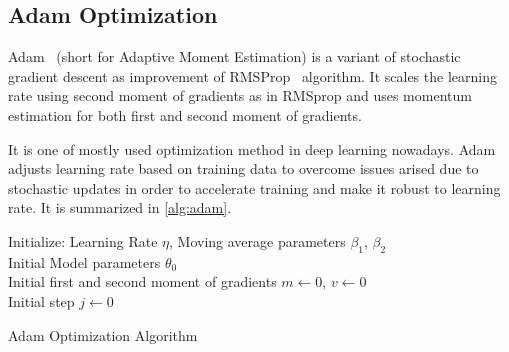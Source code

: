 \subsection{Adam Optimization}

Adam~\cite{kingma_adam_2017}  (short for Adaptive Moment Estimation) is a variant of stochastic gradient descent as improvement of RMSProp~ \cite{hinton_lecture_nodate} algorithm. 
It scales the learning rate using second moment of gradients as in RMSprop and uses momentum estimation for both first and second moment of gradients. 

It is one of mostly used optimization method in deep learning nowadays. 
Adam adjusts learning rate based on training data to overcome issues arised due to stochastic updates in order to accelerate training and make it robust to learning rate. 
It is summarized in \ref{alg:adam}. 

\begin{algorithm}[H]
	\SetAlgoLined
	\DontPrintSemicolon %
	Initialize: Learning Rate $\eta$, Moving average parameters $\beta_1$, $\beta_2$\\
	Initial Model parameters $\theta_0$ \\
	Initial first and second moment of gradients $m \leftarrow 0$, $v \leftarrow 0$ \\
	Initial step $j \leftarrow 0$ \\
	\caption{Adam Optimization Algorithm}
	\label{alg:adam}
\end{algorithm}
